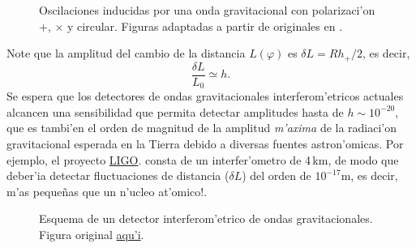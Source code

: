 \begin{center}
\begin{figure}[H]
\centerline{}
\centerline{}
\centerline{}
\caption{Oscilaciones inducidas por una onda gravitacional con polarizaci'on $+$, $\times$ y circular. Figuras adaptadas a partir de originales en \cite{Carroll97}.}
\label{fig:og}
\end{figure}
\end{center}
Note que la amplitud del cambio de la distancia $L(\varphi)$ es $\delta L=Rh_+/2$, es decir,
\begin{equation}
\boxed{ \frac{\delta L}{L_0}\simeq h .}
\end{equation}
Se espera que los detectores de ondas gravitacionales interferom'etricos actuales alcancen una sensibilidad que permita detectar amplitudes hasta de $h\sim 10^{-20}$, que es tambi'en el orden de magnitud de la amplitud \textit{m'axima} de la radiaci'on gravitacional esperada en la Tierra debido a diversas fuentes astron'omicas. Por ejemplo, el proyecto \href{http://www.ligo.caltech.edu/}{LIGO}. consta de un interfer'ometro de 4\,km, de modo que deber'ia detectar fluctuaciones de distancia ($\delta L$) del orden de $10^{-17}\text{m}$, es decir, m'as peque\~nas que un n'ucleo at'omico!.

\begin{center}
\begin{figure}[H]
\centerline{}
\caption{Esquema de un detector interferom'etrico de ondas gravitacionales. Figura original \href{http://commons.wikimedia.org/wiki/File:Ligo.svg}{aqu'i}.}
\label{fig:LIGO}
\end{figure}
\end{center}
